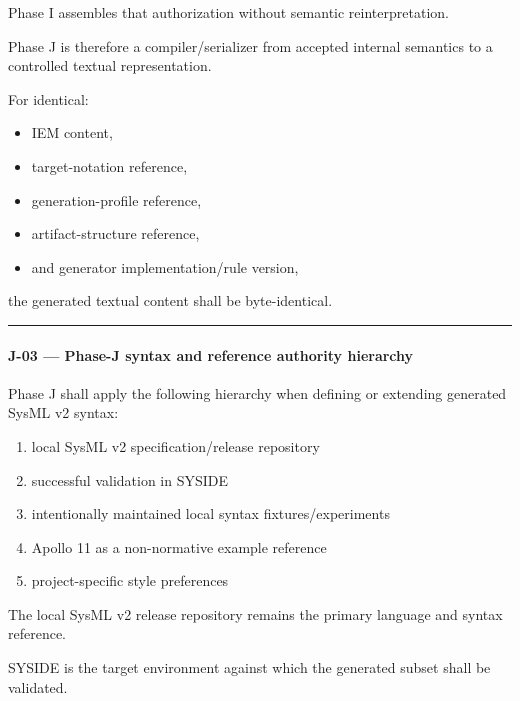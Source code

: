 Phase I assembles that authorization without semantic reinterpretation.

Phase J is therefore a compiler/serializer from accepted internal semantics to a controlled textual representation.

For identical:

\begin{itemize}
\tightlist
\item
  IEM content,
\item
  target-notation reference,
\item
  generation-profile reference,
\item
  artifact-structure reference,
\item
  and generator implementation/rule version,
\end{itemize}

the generated textual content shall be byte-identical.

\begin{center}\rule{0.5\linewidth}{0.5pt}\end{center}

\hypertarget{j-03--phase-j-syntax-and-reference-authority-hierarchy}{%
\paragraph{J-03 --- Phase-J syntax and reference authority hierarchy}\label{j-03--phase-j-syntax-and-reference-authority-hierarchy}}

Phase J shall apply the following hierarchy when defining or extending generated SysML v2 syntax:

\begin{enumerate}
\def\labelenumi{\arabic{enumi}.}
\tightlist
\item
  local SysML v2 specification/release repository
\item
  successful validation in SYSIDE
\item
  intentionally maintained local syntax fixtures/experiments
\item
  Apollo 11 as a non-normative example reference
\item
  project-specific style preferences
\end{enumerate}

The local SysML v2 release repository remains the primary language and syntax reference.

SYSIDE is the target environment against which the generated subset shall be validated.

